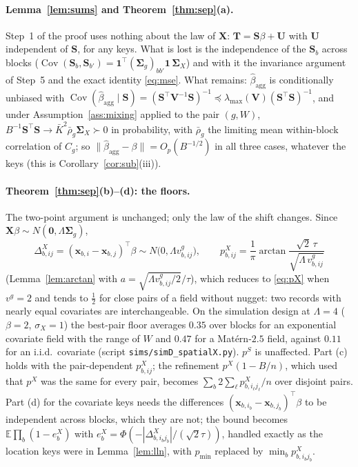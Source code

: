 \documentclass[11pt]{article}
\theoremstyle{definition}
\newcommand{\bX}{\mathbf{X}}
\newcommand{\bx}{\bm{x}}\newcommand{\bg}{\bm{g}}\newcommand{\bw}{\bm{w}}\newcommand{\bz}{\bm{z}}
\newcommand{\bS}{\mathbf{S}}
\newcommand{\bT}{\mathbf{T}}
\newcommand{\bU}{\mathbf{U}}
\newcommand{\bV}{\mathbf{V}}
\newcommand{\bone}{\mathbf{1}}
\newcommand{\bzero}{\mathbf{0}}
\newcommand{\bSig}{\boldsymbol{\Sigma}}
\newcommand{\E}{\mathbb{E}}
\newcommand{\Cov}{\operatorname{Cov}}
\newcommand{\agg}{\mathrm{agg}}
\begin{document}
\paragraph{Lemma~\ref{lem:sums} and Theorem~\ref{thm:sep}(a).} Step~1 of the proof uses nothing about the law of $\bX$: $\bT=\mathbf S\beta+\bU$ with $\bU$ independent of $\mathbf S$, for any keys. What is lost is the independence of the $\bS_b$ across blocks ($\Cov(\bS_b,\bS_{b'})=\bone^\top(\bSig_g)_{bb'}\bone\,\bSig_X$) and with it the invariance argument of Step~5 and the exact identity \eqref{eq:mse}. What remains: $\hat\beta_\agg$ is conditionally unbiased with $\Cov(\hat\beta_\agg\mid\mathbf S)=(\mathbf S^\top\bV^{-1}\mathbf S)^{-1}\preceq\lambda_{\max}(\bV)(\mathbf S^\top\mathbf S)^{-1}$, and under Assumption~\ref{ass:mixing} applied to the pair $(g,W)$, $B^{-1}\mathbf S^\top\mathbf S\to\bar K^2\bar\rho_g\bSig_X\succ0$ in probability, with $\bar\rho_g$ the limiting mean within-block correlation of $C_g$; so $\|\hat\beta_\agg-\beta\|=O_p(B^{-1/2})$ in all three cases, whatever the keys (this is Corollary~\ref{cor:sub}(iii)).

\paragraph{Theorem~\ref{thm:sep}(b)--(d): the floors.} The two-point argument is unchanged; only the law of the shift changes. Since $\bX\beta\sim N(\bzero,\Lambda\bSig_g)$,
\begin{equation}\label{eq:pX-g}
\Delta^X_{b,ij}=(\bx_{b,i}-\bx_{b,j})^\top\beta\sim N\big(0,\Lambda v^g_{b,ij}\big),\qquad
p^X_{b,ij}=\frac1\pi\arctan\frac{\sqrt2\,\tau}{\sqrt{\Lambda\,v^g_{b,ij}}}
\end{equation}
(Lemma~\ref{lem:arctan} with $a=\sqrt{\Lambda v^g_{b,ij}/2}/\tau$), which reduces to \eqref{eq:pX} when $v^g=2$ and tends to $\tfrac12$ for close pairs of a field without nugget: two records with nearly equal covariates are interchangeable. On the simulation design at $\Lambda=4$ ($\beta=2$, $\sigma_X=1$) the best-pair floor averages $0.35$ over blocks for an exponential covariate field with the range of $W$ and $0.47$ for a Mat\'ern-$2.5$ field, against $0.11$ for an i.i.d.\ covariate (script \texttt{sims/simD\_spatialX.py}). $p^S$ is unaffected. Part (c) holds with the pair-dependent $p^X_{b,ij}$; the refinement $p^X(1-B/n)$, which used that $p^X$ was the same for every pair, becomes $\sum_b2\sum_\ell p^X_{b,i_\ell j_\ell}/n$ over disjoint pairs. Part (d) for the covariate keys needs the differences $(\bx_{b,i_b}-\bx_{b,j_b})^\top\beta$ to be independent across blocks, which they are not; the bound becomes $\E\prod_b(1-e^X_b)$ with $e^X_b=\Phi(-|\Delta^X_{b,i_bj_b}|/(\sqrt2\tau))$, handled exactly as the location keys were in Lemma~\ref{lem:lln}, with $p_{\min}$ replaced by $\min_b p^X_{b,i_bj_b}$.
\end{document}
